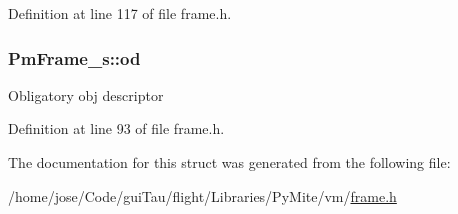 Definition at line 117 of file frame.\-h.

\hypertarget{struct_pm_frame__s_a0850b7a1ffb7143d385aa9b438a0afa4}{
\subsubsection[{od}]{ Pm\-Frame\-\_\-s\-::od}}\label{struct_pm_frame__s_a0850b7a1ffb7143d385aa9b438a0afa4}
Obligatory obj descriptor 

Definition at line 93 of file frame.\-h.



The documentation for this struct was generated from the following file\-:\begin{DoxyCompactItemize}
\item 
/home/jose/\-Code/gui\-Tau/flight/\-Libraries/\-Py\-Mite/vm/\hyperlink{frame_8h}{frame.\-h}\end{DoxyCompactItemize}
